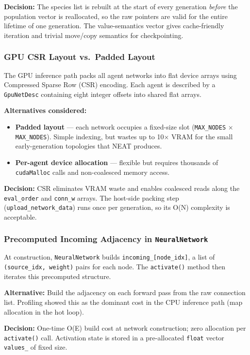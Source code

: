 \textbf{Decision:} The species list is rebuilt at the start of every generation
\emph{before} the population vector is reallocated, so the raw pointers are valid for the
entire lifetime of one generation.  The value-semantics vector gives cache-friendly
iteration and trivial move/copy semantics for checkpointing.

\subsubsection{GPU CSR Layout vs.\ Padded Layout}

The GPU inference path packs all agent networks into flat device arrays using Compressed
Sparse Row (CSR) encoding.  Each agent is described by a \texttt{GpuNetDesc} containing
eight integer offsets into shared flat arrays.

\textbf{Alternatives considered:}
\begin{itemize}[nosep]
  \item \textbf{Padded layout} — each network occupies a fixed-size slot
    (\texttt{MAX\_NODES} × \texttt{MAX\_NODES}).  Simple indexing, but wastes up to
    10× VRAM for the small early-generation topologies that NEAT produces.
  \item \textbf{Per-agent device allocation} — flexible but requires thousands of
    \texttt{cudaMalloc} calls and non-coalesced memory access.
\end{itemize}

\textbf{Decision:} CSR eliminates VRAM waste and enables coalesced reads along the
\texttt{eval\_order} and \texttt{conn\_w} arrays.  The host-side packing step
(\texttt{upload\_network\_data}) runs once per generation, so its O(N) complexity is
acceptable.

\subsubsection{Precomputed Incoming Adjacency in \texttt{NeuralNetwork}}

At construction, \texttt{NeuralNetwork} builds \texttt{incoming\_[node\_idx]}, a list of
\texttt{(source\_idx, weight)} pairs for each node.  The \texttt{activate()} method then
iterates this precomputed structure.

\textbf{Alternative:} Build the adjacency on each forward pass from the raw connection
list.  Profiling showed this as the dominant cost in the CPU inference path (map
allocation in the hot loop).

\textbf{Decision:} One-time O(E) build cost at network construction; zero allocation per
\texttt{activate()} call.  Activation state is stored in a pre-allocated \texttt{float}
vector \texttt{values\_} of fixed size.

